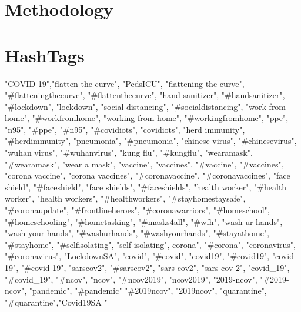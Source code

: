 \documentclass[a4paper,10pt]{article}
\begin{document}
\section{Methodology}


\section{HashTags}

"COVID-19","flatten the curve", "PedsICU", "flattening the curve", "\#flatteningthecurve", "\#flattenthecurve", "hand sanitizer", "\#handsanitizer", "\#lockdown", "lockdown", "social distancing", "\#socialdistancing", "work from home", "\#workfromhome", "working from home", "\#workingfromhome", "ppe", "n95", "\#ppe", "\#n95", "\#covidiots", "covidiots", "herd immunity", "\#herdimmunity", "pneumonia", "\#pneumonia", "chinese virus", "\#chinesevirus", "wuhan virus", "\#wuhanvirus", "kung flu", "\#kungflu", "wearamask", "\#wearamask", "wear a mask", "vaccine", "vaccines", "\#vaccine", "\#vaccines", "corona vaccine", "corona vaccines", "\#coronavaccine", "\#coronavaccines", "face shield", "\#faceshield", "face shields", "\#faceshields", "health worker", "\#health worker", "health workers", "\#healthworkers", "\#stayhomestaysafe", "\#coronaupdate", "\#frontlineheroes", "\#coronawarriors", "\#homeschool", "\#homeschooling", "\#hometasking", "\#masks4all", "\#wfh", "wash ur hands", "wash your hands", "\#washurhands", "\#washyourhands", "\#stayathome", "\#stayhome", "\#selfisolating", "self isolating",
corona", "\#corona", "coronavirus", "\#coronavirus", "LockdownSA", "covid", "\#covid", "covid19", "\#covid19", "covid-19", "\#covid-19", "sarscov2", "\#sarscov2", "sars cov2", "sars cov 2", "covid\_19", "\#covid\_19", "\#ncov", "ncov", "\#ncov2019", "ncov2019", "2019-ncov", "\#2019-ncov", "pandemic", "\#pandemic" "\#2019ncov", "2019ncov", "quarantine", "\#quarantine","Covid19SA "  \cite{debnath2020machine}



\medskip



\end{document}
